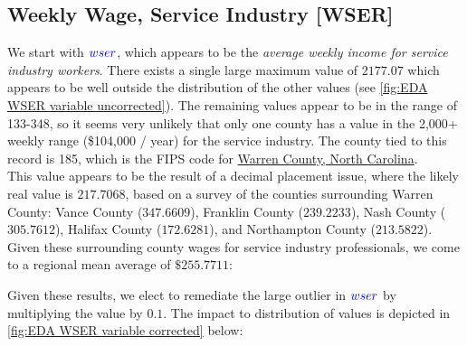\subsection{Weekly Wage, Service Industry [WSER]}

We start with $\textcolor{Blue}{wser}$, which appears to be the \textit{average weekly income for service industry workers}.  There exists a single large maximum value of $2177.07$ which appears to be well outside the distribution of the other values (see \ref{fig:EDA WSER variable uncorrected}).  The remaining values appear to be in the range of 133-348, so it seems very unlikely that only one county has a value in the 2,000+ weekly range (\$104,000 / year) for the service industry.  The county tied to this record is 185, which is the FIPS code for \href{https://en.wikipedia.org/wiki/Warren_County,_North_Carolina}{Warren County, North Carolina}.\\

This value appears to be the result of a decimal placement issue, where the likely real value is $217.7068$, based on a survey of the counties surrounding Warren County: Vance County ($347.6609$), Franklin County ($239.2233$), Nash County ($305.7612$), Halifax County ($172.6281$), and Northampton County ($213.5822$).  Given these surrounding county wages for service industry professionals, we come to a regional mean average of $\$255.7711$:\\


Given these results, we elect to remediate the large outlier in $\textcolor{Blue}{wser}$ by multiplying the value by $0.1$.  The impact to distribution of values is depicted in \ref{fig:EDA WSER variable corrected} below:\\

